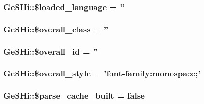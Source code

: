 \hypertarget{class_ge_s_hi_a3a21055076162213a2bea8e03e92fa28}{
\subsubsection[{\$loaded\-\_\-language}]{\setlength{\rightskip}{0pt plus 5cm}Ge\-S\-Hi\-::\$loaded\-\_\-language = ''}}\label{class_ge_s_hi_a3a21055076162213a2bea8e03e92fa28}
\hypertarget{class_ge_s_hi_abd3fa0e8c4497782aac51f1b05494bab}{
\subsubsection[{\$overall\-\_\-class}]{\setlength{\rightskip}{0pt plus 5cm}Ge\-S\-Hi\-::\$overall\-\_\-class = ''}}\label{class_ge_s_hi_abd3fa0e8c4497782aac51f1b05494bab}
\hypertarget{class_ge_s_hi_a48b5c8e8899088475f34a971e63e0b91}{
\subsubsection[{\$overall\-\_\-id}]{\setlength{\rightskip}{0pt plus 5cm}Ge\-S\-Hi\-::\$overall\-\_\-id = ''}}\label{class_ge_s_hi_a48b5c8e8899088475f34a971e63e0b91}
\hypertarget{class_ge_s_hi_ab22479e661609e9181548954e439ad95}{
\subsubsection[{\$overall\-\_\-style}]{\setlength{\rightskip}{0pt plus 5cm}Ge\-S\-Hi\-::\$overall\-\_\-style = 'font-\/family\-:monospace;'}}\label{class_ge_s_hi_ab22479e661609e9181548954e439ad95}
\hypertarget{class_ge_s_hi_a74af0146a69db0a551368b25b6496a93}{
\subsubsection[{\$parse\-\_\-cache\-\_\-built}]{\setlength{\rightskip}{0pt plus 5cm}Ge\-S\-Hi\-::\$parse\-\_\-cache\-\_\-built = false}}\label{class_ge_s_hi_a74af0146a69db0a551368b25b6496a93}
